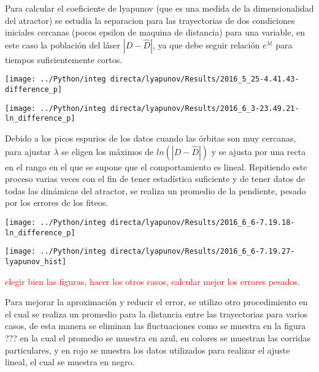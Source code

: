 	Para calcular el coeficiente de lyapunov (que es una medida de la dimensionalidad del atractor) se estudia la separacion para las trayectorias de dos condiciones iniciales cercanas (pocos epsilon de maquina de distancia) para una variable, en este caso la población del láser $|D-\hat{D}|$, ya que debe seguir relación $e^{\lambda t}$ para tiempos suficientemente cortos.
	
	 
	\begin{minipage}{0.5\textwidth}
		\begin{center}
			\texttt{[image: ../Python/integ directa/lyapunov/Results/2016\_5\_25-4.41.43-difference\_p]}
		\end{center}
	\end{minipage}
	\begin{minipage}{0.5\textwidth}
		\begin{center}
			\texttt{[image: ../Python/integ directa/lyapunov/Results/2016\_6\_3-23.49.21-ln\_difference\_p]}
		\end{center}
	\end{minipage}

	Debido a los picos espurios de los datos cuando las órbitas son muy cercanas, para ajustar $\lambda$ se eligen los máximos de $ln(|D-\hat{D}|)$ y se ajusta por una recta en el rango en el que se supone que el comportamiento es lineal.
	Repitiendo este proceso varias veces con el fin de tener estadística suficiente y de tener datos de todas las dinámicas del atractor, se realiza un promedio de la pendiente, pesado por los errores de los fiteos.	
	
	\begin{minipage}{0.5\textwidth}
		\begin{center}
			\texttt{[image: ../Python/integ directa/lyapunov/Results/2016\_6\_6-7.19.18-ln\_difference\_p]}
		\end{center}
	\end{minipage}
	\begin{minipage}{0.5\textwidth}
		\begin{center}
			\texttt{[image: ../Python/integ directa/lyapunov/Results/2016\_6\_6-7.19.27-lyapunov\_hist]}
		\end{center}
	\end{minipage}
	
		\textcolor{red}{elegir bien las figuras, hacer los otros casos, calcular mejor los errores pesados. }
		
		
	Para mejorar la aproximación y reducir el error, se utilizo otro procedimiento en el cual se realiza un promedio para la distancia entre las trayectorias para varios casos, de esta manera se eliminan las fluctuaciones como se muestra en la figura ??? en la cual el promedio se muestra en azul, en colores se muestran las corridas particulares, y en rojo se muestra los datos utilizados para realizar el ajuste lineal, el cual se muestra en negro.
	
